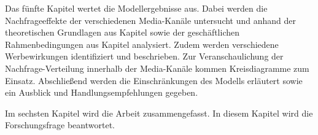 Das fünfte Kapitel  wertet die Modellergebnisse aus. Dabei werden die Nachfrageeffekte der verschiedenen Media-Kanäle untersucht und anhand der theoretischen Grundlagen aus Kapitel  sowie der geschäftlichen Rahmenbedingungen aus Kapitel  analysiert. Zudem werden verschiedene Werbewirkungen identifiziert und beschrieben. Zur Veranschaulichung der Nachfrage-Verteilung innerhalb der Media-Kanäle kommen Kreisdiagramme zum Einsatz. Abschließend werden die Einschränkungen des Modells erläutert sowie ein Ausblick und Handlungsempfehlungen gegeben. \par
Im sechsten Kapitel  wird die Arbeit zusammengefasst. In diesem Kapitel wird die Forschungsfrage beantwortet. 
